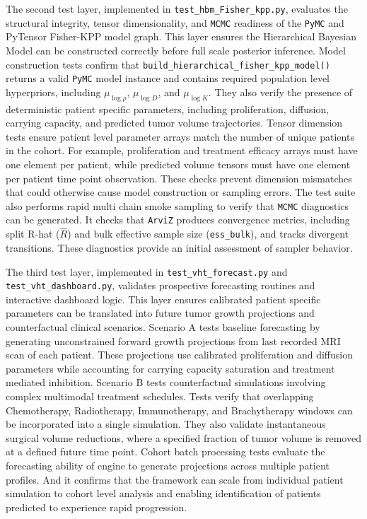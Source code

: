 The second test layer, implemented in \texttt{test\_hbm\_Fisher\_kpp.py}, evaluates the structural integrity, tensor dimensionality, and \texttt{MCMC} readiness of the \texttt{PyMC} and PyTensor Fisher-KPP model graph. This layer ensures the Hierarchical Bayesian Model can be constructed correctly before full scale posterior inference. Model construction tests confirm that \texttt{build\_hierarchical\_fisher\_kpp\_model()} returns a valid \texttt{PyMC} model instance and contains required population level hyperpriors, including $\mu_{\log \rho}$, $\mu_{\log D}$, and $\mu_{\log K}$. They also verify the presence of deterministic patient specific parameters, including proliferation, diffusion, carrying capacity, and predicted tumor volume trajectories. Tensor dimension tests ensure patient level parameter arrays match the number of unique patients in the cohort. For example, proliferation and treatment efficacy arrays must have one element per patient, while predicted volume tensors must have one element per patient time point observation. These checks prevent dimension mismatches that could otherwise cause model construction or sampling errors. The test suite also performs rapid multi chain smoke sampling to verify that \texttt{MCMC} diagnostics can be generated. It checks that \texttt{ArviZ} produces convergence metrics, including split R-hat ($\widehat{R}$) and bulk effective sample size (\texttt{ess\_bulk}), and tracks divergent transitions. These diagnostics provide an initial assessment of sampler behavior.

The third test layer, implemented in \texttt{test\_vht\_forecast.py} and \texttt{test\_vht\_dashboard.py}, validates prospective forecasting routines and interactive dashboard logic. This layer ensures calibrated patient specific parameters can be translated into future tumor growth projections and counterfactual clinical scenarios. Scenario A tests baseline forecasting by generating unconstrained forward growth projections from last recorded MRI scan of each patient. These projections use calibrated proliferation and diffusion parameters while accounting for carrying capacity saturation and treatment mediated inhibition. Scenario B tests counterfactual simulations involving complex multimodal treatment schedules. Tests verify that overlapping Chemotherapy, Radiotherapy, Immunotherapy, and Brachytherapy windows can be incorporated into a single simulation. They also validate instantaneous surgical volume reductions, where a specified fraction of tumor volume is removed at a defined future time point. Cohort batch processing tests evaluate the forecasting ability of engine to generate projections across multiple patient profiles. And it confirms that the framework can scale from individual patient simulation to cohort level analysis and enabling identification of patients predicted to experience rapid progression.

